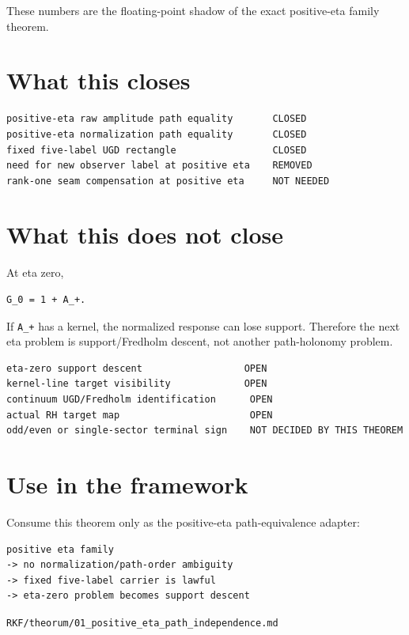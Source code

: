 These numbers are the floating-point shadow of the exact positive-eta family theorem.

\hypertarget{what-this-closes}{%
\section{What this closes}\label{what-this-closes}}

\begin{verbatim}
positive-eta raw amplitude path equality       CLOSED
positive-eta normalization path equality       CLOSED
fixed five-label UGD rectangle                 CLOSED
need for new observer label at positive eta    REMOVED
rank-one seam compensation at positive eta     NOT NEEDED
\end{verbatim}

\hypertarget{what-this-does-not-close}{%
\section{What this does not close}\label{what-this-does-not-close}}

At eta zero,

\begin{verbatim}
G_0 = 1 + A_+.
\end{verbatim}

If \texttt{A\_+} has a kernel, the normalized response can lose support. Therefore the next eta problem is support/Fredholm descent, not another path-holonomy problem.

\begin{verbatim}
eta-zero support descent                  OPEN
kernel-line target visibility             OPEN
continuum UGD/Fredholm identification      OPEN
actual RH target map                       OPEN
odd/even or single-sector terminal sign    NOT DECIDED BY THIS THEOREM
\end{verbatim}

\hypertarget{use-in-the-framework}{%
\section{Use in the framework}\label{use-in-the-framework}}

Consume this theorem only as the positive-eta path-equivalence adapter:

\begin{verbatim}
positive eta family
-> no normalization/path-order ambiguity
-> fixed five-label carrier is lawful
-> eta-zero problem becomes support descent
\end{verbatim}

\begin{flushright}\small\texttt{RKF/theorum/01\_positive\_eta\_path\_independence.md}\end{flushright}
